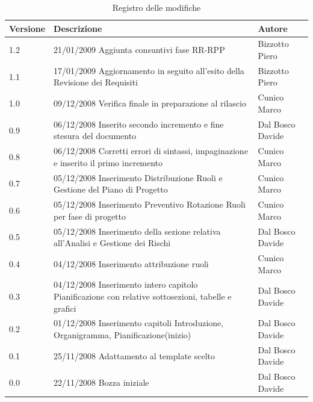 \begin{center}
	\begin{table}[h]
		  \begin{tabular*}
			{1\textwidth}%
				{@{\extracolsep{\fill}}|p{}|p{}|p{}|}
			 \hline
			\textbf{Versione}  & \textbf{Descrizione} & \textbf{Autore} \\
		 \hline
			1.2 & 21/01/2009	Aggiunta consuntivi fase RR-RPP & Bizzotto Piero \\
			\hline
			1.1 & 17/01/2009	Aggiornamento in seguito all'esito della Revisione dei Requisiti & Bizzotto Piero \\
			\hline
			1.0 & 	 09$\slash$12$\slash$2008 Verifica finale in preparazione al rilascio & Cunico Marco \\
			\hline
          0.9 & 06/12/2008 Inserito secondo incremento e fine stesura del documento & Dal Bosco Davide\\
          \hline
          0.8 & 06/12/2008 Corretti errori di sintassi, impaginazione e inserito il primo incremento & Cunico Marco \\
		 \hline
          0.7 & 05/12/2008 Inserimento Distribuzione Ruoli e Gestione del Piano di Progetto & Cunico Marco \\
          \hline
          0.6 & 05/12/2008 Inserimento Preventivo Rotazione Ruoli per fase di progetto & Cunico Marco \\
          \hline
          0.5 & 05/12/2008 Inserimento della sezione relativa all'Analisi e Gestione dei Rischi & Dal Bosco Davide \\
          \hline         
          0.4 & 04/12/2008 Inserimento attribuzione ruoli & Cunico Marco \\
          \hline	          
          0.3 & 04/12/2008 Inserimento intero capitolo Pianificazione con relative sottosezioni, tabelle e grafici & Dal Bosco Davide \\
          \hline
    	  0.2 & 01/12/2008 Inserimento capitoli Introduzione, Organigramma, Pianificazione(inizio) & Dal Bosco Davide \\
    	  \hline
    	  0.1 & 25/11/2008 Adattamento al template scelto & Dal Bosco Davide \\
    	  \hline
    	  0.0 & 22/11/2008 Bozza iniziale & Dal Bosco Davide \\

		\hline %
		\end{tabular*}
	\caption{Registro delle modifiche} %
	\label{tab:modifiche}
	\end{table}
\end{center}


